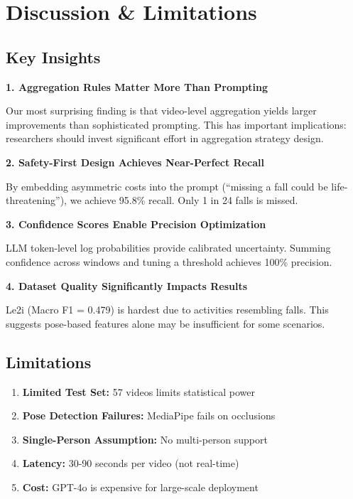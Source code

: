 \documentclass[conference]{IEEEtran}
\begin{document}
\section{Discussion \& Limitations}

\subsection{Key Insights}

\textbf{1. Aggregation Rules Matter More Than Prompting}

Our most surprising finding is that video-level aggregation yields larger improvements than sophisticated prompting. This has important implications: researchers should invest significant effort in aggregation strategy design.

\textbf{2. Safety-First Design Achieves Near-Perfect Recall}

By embedding asymmetric costs into the prompt (``missing a fall could be life-threatening''), we achieve 95.8\% recall. Only 1 in 24 falls is missed.

\textbf{3. Confidence Scores Enable Precision Optimization}

LLM token-level log probabilities provide calibrated uncertainty. Summing confidence across windows and tuning a threshold achieves 100\% precision.

\textbf{4. Dataset Quality Significantly Impacts Results}

Le2i (Macro F1 = 0.479) is hardest due to activities resembling falls. This suggests pose-based features alone may be insufficient for some scenarios.

\subsection{Limitations}

\begin{enumerate}[leftmargin=*]
    \item \textbf{Limited Test Set:} 57 videos limits statistical power
    \item \textbf{Pose Detection Failures:} MediaPipe fails on occlusions
    \item \textbf{Single-Person Assumption:} No multi-person support
    \item \textbf{Latency:} 30-90 seconds per video (not real-time)
    \item \textbf{Cost:} GPT-4o is expensive for large-scale deployment
\end{enumerate}
\end{document}
